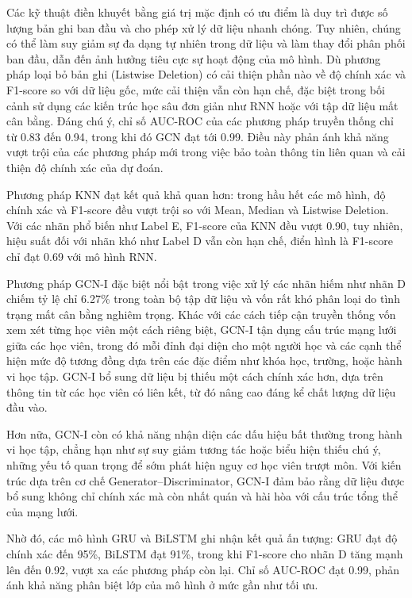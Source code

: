 Các kỹ thuật điền khuyết bằng giá trị mặc định có ưu điểm là duy trì được số lượng bản ghi ban đầu và cho phép xử lý dữ liệu nhanh chóng. Tuy nhiên, chúng có thể làm suy giảm sự đa dạng tự nhiên trong dữ liệu và làm thay đổi phân phối ban đầu, dẫn đến ảnh hưởng tiêu cực sự hoạt động của mô hình. Dù phương pháp loại bỏ bản ghi (Listwise Deletion) có cải thiện phần nào về độ chính xác và F1-score so với dữ liệu gốc, mức cải thiện vẫn còn hạn chế, đặc biệt trong bối cảnh sử dụng các kiến trúc học sâu đơn giản như RNN hoặc với tập dữ liệu mất cân bằng. Đáng chú ý, chỉ số AUC-ROC của các phương pháp truyền thống chỉ từ 0.83 đến 0.94, trong khi đó GCN đạt tới 0.99. Điều này phản ánh khả năng vượt trội của các phương pháp mới trong việc bảo toàn thông tin liên quan và cải thiện độ chính xác của dự đoán.

Phương pháp KNN đạt kết quả khả quan hơn: trong hầu hết các mô hình, độ chính xác và F1-score đều vượt trội so với Mean, Median và Listwise Deletion. Với các nhãn phổ biến như Label E, F1-score của KNN đều vượt 0.90, tuy nhiên, hiệu suất đối với nhãn khó như Label D vẫn còn hạn chế, điển hình là F1-score chỉ đạt 0.69 với mô hình RNN.

Phương pháp GCN-I đặc biệt nổi bật trong việc xử lý các nhãn hiếm như nhãn D chiếm tỷ lệ chỉ 6.27\% trong toàn bộ tập dữ liệu và vốn rất khó phân loại do tình trạng mất cân bằng nghiêm trọng. Khác với các cách tiếp cận truyền thống vốn xem xét từng học viên một cách riêng biệt, GCN-I tận dụng cấu trúc mạng lưới giữa các học viên, trong đó mỗi đỉnh đại diện cho một người học và các cạnh thể hiện mức độ tương đồng dựa trên các đặc điểm như khóa học, trường, hoặc hành vi học tập. GCN-I bổ sung dữ liệu bị thiếu một cách chính xác hơn, dựa trên thông tin từ các học viên có liên kết, từ đó nâng cao đáng kể chất lượng dữ liệu đầu vào.

Hơn nữa, GCN-I còn có khả năng nhận diện các dấu hiệu bất thường trong hành vi học tập, chẳng hạn như sự suy giảm tương tác hoặc biểu hiện thiếu chú ý, những yếu tố quan trọng để sớm phát hiện nguy cơ học viên trượt môn. Với kiến trúc dựa trên cơ chế Generator–Discriminator, GCN-I đảm bảo rằng dữ liệu được bổ sung không chỉ chính xác mà còn nhất quán và hài hòa với cấu trúc tổng thể của mạng lưới.

Nhờ đó, các mô hình GRU và BiLSTM ghi nhận kết quả ấn tượng: GRU đạt độ chính xác đến 95\%, BiLSTM đạt 91\%, trong khi F1-score cho nhãn D tăng mạnh lên đến 0.92, vượt xa các phương pháp còn lại. Chỉ số AUC-ROC đạt 0.99, phản ánh khả năng phân biệt lớp của mô hình ở mức gần như tối ưu.

